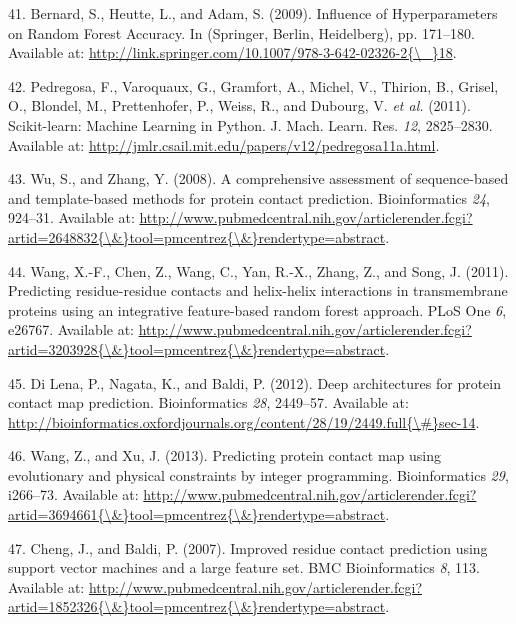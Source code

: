 \documentclass[12pt,a4paper,twoside]{book}
\theoremstyle{definition}
\theoremstyle{definition}
\theoremstyle{remark}
\begin{document}
\hypertarget{ref-Bernard2009}{}
41. Bernard, S., Heutte, L., and Adam, S. (2009). Influence of
Hyperparameters on Random Forest Accuracy. In (Springer, Berlin,
Heidelberg), pp. 171--180. Available at:
\href{http://link.springer.com/10.1007/978-3-642-02326-2\%7B/_\%7D18}{http://link.springer.com/10.1007/978-3-642-02326-2\{\textbackslash{}\_\}18}.

\hypertarget{ref-Pedregosa2011}{}
42. Pedregosa, F., Varoquaux, G., Gramfort, A., Michel, V., Thirion, B.,
Grisel, O., Blondel, M., Prettenhofer, P., Weiss, R., and Dubourg, V.
\emph{et al.} (2011). Scikit-learn: Machine Learning in Python. J. Mach.
Learn. Res. \emph{12}, 2825--2830. Available at:
\url{http://jmlr.csail.mit.edu/papers/v12/pedregosa11a.html}.

\hypertarget{ref-Wu2008}{}
43. Wu, S., and Zhang, Y. (2008). A comprehensive assessment of
sequence-based and template-based methods for protein contact
prediction. Bioinformatics \emph{24}, 924--31. Available at:
\href{http://www.pubmedcentral.nih.gov/articlerender.fcgi?artid=2648832\%7B/\&\%7Dtool=pmcentrez\%7B/\&\%7Drendertype=abstract}{http://www.pubmedcentral.nih.gov/articlerender.fcgi?artid=2648832\{\textbackslash{}\&\}tool=pmcentrez\{\textbackslash{}\&\}rendertype=abstract}.

\hypertarget{ref-Wang2011}{}
44. Wang, X.-F., Chen, Z., Wang, C., Yan, R.-X., Zhang, Z., and Song, J.
(2011). Predicting residue-residue contacts and helix-helix interactions
in transmembrane proteins using an integrative feature-based random
forest approach. PLoS One \emph{6}, e26767. Available at:
\href{http://www.pubmedcentral.nih.gov/articlerender.fcgi?artid=3203928\%7B/\&\%7Dtool=pmcentrez\%7B/\&\%7Drendertype=abstract}{http://www.pubmedcentral.nih.gov/articlerender.fcgi?artid=3203928\{\textbackslash{}\&\}tool=pmcentrez\{\textbackslash{}\&\}rendertype=abstract}.

\hypertarget{ref-DiLena2012a}{}
45. Di Lena, P., Nagata, K., and Baldi, P. (2012). Deep architectures
for protein contact map prediction. Bioinformatics \emph{28}, 2449--57.
Available at:
\href{http://bioinformatics.oxfordjournals.org/content/28/19/2449.full\%7B/\#\%7Dsec-14}{http://bioinformatics.oxfordjournals.org/content/28/19/2449.full\{\textbackslash{}\#\}sec-14}.

\hypertarget{ref-Wang2013}{}
46. Wang, Z., and Xu, J. (2013). Predicting protein contact map using
evolutionary and physical constraints by integer programming.
Bioinformatics \emph{29}, i266--73. Available at:
\href{http://www.pubmedcentral.nih.gov/articlerender.fcgi?artid=3694661\%7B/\&\%7Dtool=pmcentrez\%7B/\&\%7Drendertype=abstract}{http://www.pubmedcentral.nih.gov/articlerender.fcgi?artid=3694661\{\textbackslash{}\&\}tool=pmcentrez\{\textbackslash{}\&\}rendertype=abstract}.

\hypertarget{ref-Cheng2007}{}
47. Cheng, J., and Baldi, P. (2007). Improved residue contact prediction
using support vector machines and a large feature set. BMC
Bioinformatics \emph{8}, 113. Available at:
\href{http://www.pubmedcentral.nih.gov/articlerender.fcgi?artid=1852326\%7B/\&\%7Dtool=pmcentrez\%7B/\&\%7Drendertype=abstract}{http://www.pubmedcentral.nih.gov/articlerender.fcgi?artid=1852326\{\textbackslash{}\&\}tool=pmcentrez\{\textbackslash{}\&\}rendertype=abstract}.
\end{document}
